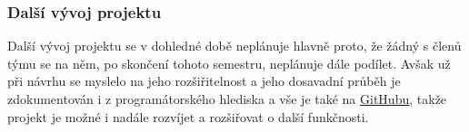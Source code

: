 \documentclass{beamer}
\begin{document}
\begin{frame}[allowframebreaks]\frametitle{Další vývoj projektu}
		
	Další vývoj projektu se v dohledné době neplánuje hlavně proto, že žádný s členů týmu se na něm, po skončení tohoto semestru, neplánuje dále podílet. Avšak už při návrhu se myslelo na jeho rozšiřitelnost a jeho dosavadní průběh je zdokumentován i z programátorského hlediska a vše je také na \href{https://github.com/kozajaku/www-presentations-checker}{\underline{GitHubu}}, takže projekt je možné i nadále rozvíjet a rozšiřovat o další funkčnosti.
		
\end{frame}
\end{document}
